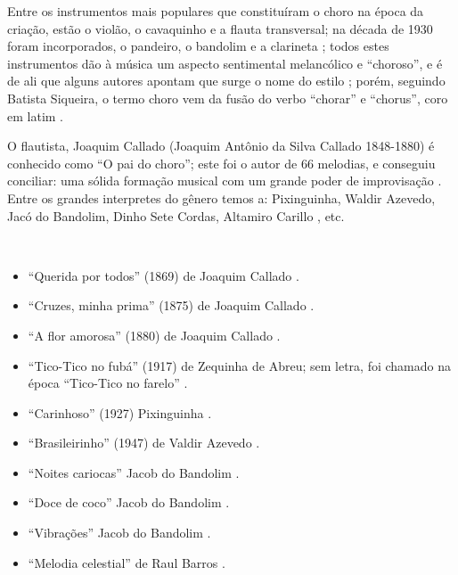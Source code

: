 Entre os instrumentos mais populares que constituíram o choro na época da criação, 
estão o violão, o cavaquinho e a flauta transversal;
na década de 1930 foram incorporados, o pandeiro, o bandolim e a clarineta \cite[pp. 64]{reinato2010musica} \cite[pp. 79]{dourado2004dicionario} \cite[pp. 132]{perna2002samba};
todos estes instrumentos dão à música um aspecto sentimental melancólico e ``choroso'', e
é de ali que alguns autores apontam que surge o nome do estilo \cite[pp. 132]{perna2002samba};
porém, seguindo Batista Siqueira, 
o termo choro vem da fusão do verbo ``chorar'' e ``chorus'', coro em latim \cite[pp. 13]{diniz2003almanaque}.

O flautista, Joaquim Callado (Joaquim Antônio da Silva Callado 1848-1880) 
é conhecido como ``O pai do choro'';
este foi o autor de 66 melodias, e conseguiu conciliar: 
uma sólida formação musical com um grande poder de improvisação  \cite[pp. 15]{diniz2003almanaque} \cite[pp. 64]{reinato2010musica}.
Entre os grandes interpretes do gênero temos a:
Pixinguinha, Waldir Azevedo, Jacó do Bandolim, Dinho Sete Cordas, Altamiro Carillo \cite[pp. 79]{dourado2004dicionario}, etc.

\begin{example} ~

\begin{itemize}
\item ``Querida por todos'' (1869) de Joaquim Callado \cite[pp. 15]{diniz2003almanaque} \cite[pp. 1089]{marcondes1977enciclopediav2}.
\item ``Cruzes, minha prima'' (1875) de Joaquim Callado \cite[pp. 15]{diniz2003almanaque} \cite[pp. 951]{marcondes1977enciclopediav2}.
\item ``A flor amorosa'' (1880) de Joaquim Callado \cite[pp. 8]{livingston2005choro} \cite[pp. 15]{diniz2003almanaque}  \cite[pp. 985]{marcondes1977enciclopediav2}.
\item ``Tico-Tico no fubá'' (1917) de Zequinha de Abreu; sem letra, foi chamado na época ``Tico-Tico no farelo'' \cite[pp. 6]{marcondes1998enciclopedia} \cite[pp. 39,91]{diniz2003almanaque}.
\item ``Carinhoso'' (1927) Pixinguinha   \cite[pp. 133]{perna2002samba}.
\item ``Brasileirinho'' (1947) de Valdir Azevedo  \cite[pp. 133]{perna2002samba}.
\item ``Noites cariocas'' Jacob do Bandolim \cite{diniz2003almanaque}.
\item ``Doce de coco'' Jacob do Bandolim \cite{diniz2003almanaque}.
\item ``Vibrações'' Jacob do Bandolim \cite{diniz2003almanaque}.
\item ``Melodia celestial'' de Raul Barros \cite[pp. 130]{livingston2005choro}.
\end{itemize}
\end{example}

